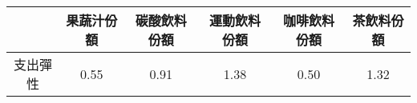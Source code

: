 \begin{tabular}{cccccc}
  \hline
 & 果蔬汁份額 & 碳酸飲料份額 & 運動飲料份額 & 咖啡飲料份額 & 茶飲料份額 \\ 
  \hline
支出彈性 & 0.55 & 0.91 & 1.38 & 0.50 & 1.32 \\ 
   \hline
\end{tabular}
